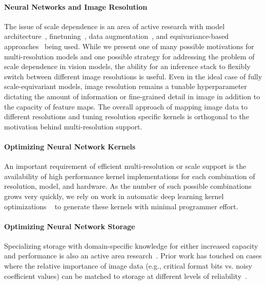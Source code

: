 \paragraph{Neural Networks and Image Resolution}
The issue of scale dependence is an area of active research with model architecture~\cite{DBLP:journals/corr/KanazawaSJ14}, finetuning~\cite{touvron2019fixing}, data augmentation~\cite{hoffer2019mix}, and equivariance-based approaches~\cite{sosnovik2019scaleequivariant} being used.
While we present one of many possible motivations for multi-resolution models and one possible strategy for addressing the problem of scale dependence in vision models, the ability for an inference stack to flexibly switch between different image resolutions is useful.
Even in the ideal case of fully scale-equivariant models, image resolution remains a tunable hyperparameter dictating the amount of information or fine-grained detail in image in addition to the capacity of feature maps.
The overall approach of mapping image data to different resolutions and tuning resolution specific kernels is orthogonal to the motivation behind multi-resolution support.


\paragraph{Optimizing Neural Network Kernels}
An important requirement of efficient multi-resolution or scale support is the availability of high performance kernel implementations for each combination of resolution, model, and hardware.
As the number of such possible combinations grows very quickly, we rely on work in automatic deep learning kernel optimizations ~\cite{ragan2013halide, chen2018tvm, zheng2020ansor, cowan2020automatic} to generate these kernels with minimal programmer effort.

\paragraph{Optimizing Neural Network Storage}
Specializing storage with domain-specific knowledge for either increased capacity and performance is also an active area research~\cite{sampson2014approximate, jevdjic2017approximate, mazumdar2019vignette}.
Prior work has touched on cases where the relative importance of image data (e.g., critical format bits vs. noisy coefficient values) can be matched to storage at different levels of reliability~\cite{guo2016high, jevdjic2017approximate}.

